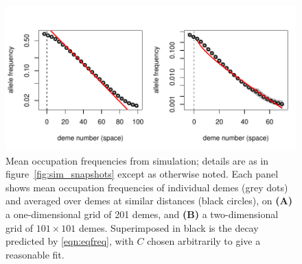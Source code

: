 \documentclass{article}
\begin{document}
\begin{figure}[ht!]
  \begin{center}
    \includegraphics{sim-occupation-freqs}
  \end{center}
  \label{fig:sim_occupation_freqs}
  \caption{
  Mean occupation frequencies from simulation; details are as in figure~\ref{fig:sim_snapshots} except as otherwise noted.
  Each panel shows mean occupation frequencies of individual demes (grey dots)
  and averaged over demes at similar distances (black circles), on
  \textbf{(A)} a one-dimensional grid of 201 demes, and
  \textbf{(B)} a two-dimensional grid of $101\times 101$ demes.
  Superimposed in black is the decay predicted by \eqref{eqn:eqfreq},
  with $C$ chosen arbitrarily to give a reasonable fit.
  }
\end{figure}
\end{document}
